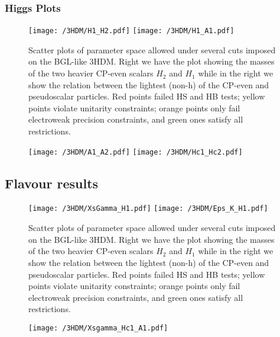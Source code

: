 \subsubsection{Higgs Plots}



\begin{figure}[H]
	\centering
	\texttt{[image: /3HDM/H1\_H2.pdf]}
	\texttt{[image: /3HDM/H1\_A1.pdf]}
	\caption{Scatter plots of parameter space allowed under  several cuts imposed on the BGL-like 3HDM. Right we have the plot showing the masses of the two heavier CP-even scalars $H_2$ and $H_1$ while in the right we show the relation between the lightest
(non-h) of the CP-even and pseudoscalar particles. Red points failed HS and HB tests; yellow points violate unitarity constraints; orange points only fail electroweak precision constraints, and green ones satisfy all restrictions.}
	\label{fig:STU}
\end{figure}	

\begin{figure}[H]
	\centering
	\texttt{[image: /3HDM/A1\_A2.pdf]}
	\texttt{[image: /3HDM/Hc1\_Hc2.pdf]}
	\caption{}
	\label{fig:STU}
\end{figure}	

\subsection{Flavour results}

\begin{figure}[H]
	\centering
	\texttt{[image: /3HDM/XsGamma\_H1.pdf]}
	\texttt{[image: /3HDM/Eps\_K\_H1.pdf]}
	\caption{Scatter plots of parameter space allowed under  several cuts imposed on the BGL-like 3HDM. Right we have the plot showing the masses of the two heavier CP-even scalars $H_2$ and $H_1$ while in the right we show the relation between the lightest
(non-h) of the CP-even and pseudoscalar particles. Red points failed HS and HB tests; yellow points violate unitarity constraints; orange points only fail electroweak precision constraints, and green ones satisfy all restrictions.}
	\label{fig:STU}
\end{figure}	


\begin{figure}[H]
	\centering
	\texttt{[image: /3HDM/Xsgamma\_Hc1\_A1.pdf]}
	\caption{}
	\label{fig:STU}
\end{figure}	

